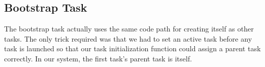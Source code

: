 \documentclass[pdftex,10pt,a4paper]{article}
\begin{document}
\subsection*{Bootstrap Task}

The bootstrap task actually uses the same code path for creating
itself as other tasks. The only trick required was that we had to set
an active task before any task is launched so that our task
initialization function could assign a parent task correctly. In our
system, the first task's parent task is itself.
\end{document}
